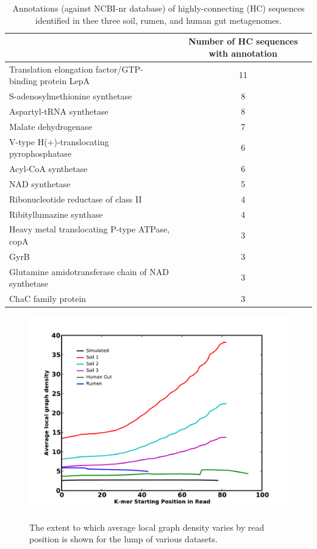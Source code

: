 \documentclass[10pt]{article}
\begin{document}
\begin{table}
\caption{Annotations (against NCBI-nr database) of highly-connecting (HC) sequences identified in thee three soil, rumen, and human gut metagenomes.}
\begin{tabular}{l c}
\hline
& Number of HC sequences with annotation \\
\hline
Translation elongation factor/GTP-binding protein LepA	&11\\
S-adenosylmethionine synthetase	&8\\
Aspartyl-tRNA synthetase	 &8\\
Malate dehydrogenase	&7\\
V-type H(+)-translocating pyrophosphatase	&6\\
Acyl-CoA synthetase	&6\\
NAD synthetase 	&5\\
Ribonucleotide reductase of class II	&4\\
Ribityllumazine synthase	&4\\
Heavy metal translocating P-type ATPase, copA	&3\\
GyrB	 &3\\
Glutamine amidotransferase chain of NAD synthetase	&3\\
ChaC family protein	&3\\
\end{tabular}
\label{meta-stoptags}
\end{table}

\begin{figure}[h]
\center
{\includegraphics[width=5in]{./figures/figure1-density.pdf}}
\caption{The extent to which average local graph density varies by read position is shown for the lump of various datasets.}
\label{density-pos}
\end{figure}
\end{document}
